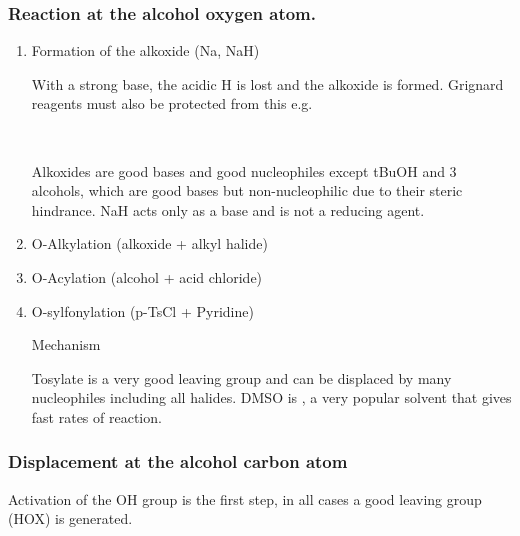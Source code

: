 \subsubsection{Reaction at the alcohol oxygen atom.}

\begin{enumerate}[label=\alph*)]

	\item Formation of the alkoxide (Na, NaH)

		With a strong base, the acidic H is lost and the alkoxide is formed.
		Grignard reagents must also be protected from this e.g.

		\begin{center}
			\\
		\end{center}

		Alkoxides are good bases and good nucleophiles except tBuOH and
		3\super{$\circ$} alcohols, which are good bases but non-nucleophilic due
		to their steric hindrance. NaH acts only as a base and is not a reducing
		agent.

	\item O-Alkylation (alkoxide + alkyl halide)


	\item O-Acylation (alcohol + acid chloride)


	\item O-sylfonylation (p-TsCl + Pyridine)

		Mechanism

		Tosylate is a very good leaving group and can be displaced by many
		nucleophiles including all halides.
		DMSO is , a very popular solvent that gives fast rates of reaction.

\end{enumerate}

\subsubsection{Displacement at the alcohol carbon atom}

Activation of the OH group is the first step, in all cases a good leaving group
(HOX) is generated.

